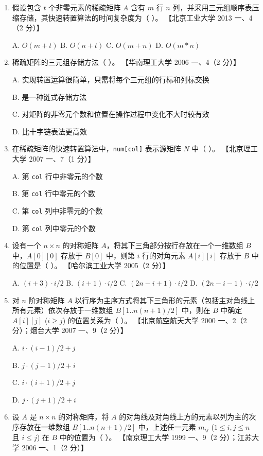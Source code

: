 \documentclass[lang=cn,newtx,10pt,scheme=chinese]{../../elegantbook}
\begin{document}
\begin{enumerate}
    \item 假设包含 $t$ 个非零元素的稀疏矩阵 $A$ 含有 $m$ 行 $n$ 列，并采用三元组顺序表压缩存储，其快速转置算法的时间复杂度为（ ）。  
    【北京工业大学 2013 一、4（2 分）】

    A. $O(m+t)$ \quad B. $O(n+t)$ \quad C. $O(m+n)$ \quad D. $O(m*n)$  

    \item 稀疏矩阵的三元组存储方法（ ）。  
    【华南理工大学 2006 一、4（2 分）】  

    A. 实现转置运算很简单，只需将每个三元组的行标和列标交换  

    B. 是一种链式存储方法  

    C. 对矩阵的非零元个数和位置在操作过程中变化不大时较有效  

    D. 比十字链表法更高效  

    \item 在稀疏矩阵的快速转置算法中，\texttt{num[col]} 表示源矩阵 $N$ 中（ ）。  
    【北京理工大学 2007 一、7（1 分）】  

    A. 第 \texttt{col} 行中非零元的个数  

    B. 第 \texttt{col} 行中零元的个数  

    C. 第 \texttt{col} 列中非零元的个数  

    D. 第 \texttt{col} 列中零元的个数  

    \item 设有一个 $n \times n$ 的对称矩阵 $A$，将其下三角部分按行存放在一个一维数组 $B$ 中，$A[0][0]$ 存放于 $B[0]$ 中，则第 $i$ 行的对角元素 $A[i][i]$ 存放于 $B$ 中的位置是（ ）。  
    【哈尔滨工业大学 2005（2 分）】  

    A. $(i+3) \cdot i / 2$ \quad B. $(i+1) \cdot i / 2$ \quad C. $(2n-i+1) \cdot i / 2$ \quad D. $(2n-i-1) \cdot i / 2$  

    \item 对 $n$ 阶对称矩阵 $A$ 以行序为主序方式将其下三角形的元素（包括主对角线上所有元素）依次存放于一维数组 $B[1..n(n+1)/2]$ 中，则在 $B$ 中确定 $A[i][j]$ ($i \geq j$) 的位置关系为（ ）。  
    【北京航空航天大学 2000 一、2（2 分）；烟台大学 2007 一、9（2 分）】  

    A. $i \cdot (i-1)/2 + j$  

    B. $j \cdot (j-1)/2 + i$  

    C. $i \cdot (i+1)/2 + j$  

    D. $j \cdot (j+1)/2 + i$  

    \item 设 $A$ 是 $n \times n$ 的对称矩阵，将 $A$ 的对角线及对角线上方的元素以列为主的次序存放在一维数组 $B[1..n(n+1)/2]$ 中，上述任一元素 $m_{ij}$ ($1 \leq i, j \leq n$ 且 $i \leq j$) 在 $B$ 中的位置为（ ）。  
    【南京理工大学 1999 一、9（2 分）；江苏大学 2006 一、1（2 分）】 


\end{enumerate}
\end{document}
